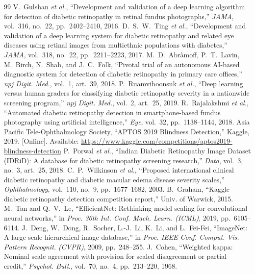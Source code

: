 \documentclass[conference]{IEEEtran}
\begin{document}
\begin{thebibliography}{99}
 V.~Gulshan \textit{et al.}, ``Development and validation of a deep learning algorithm for
detection of diabetic retinopathy in retinal fundus photographs,'' \textit{JAMA}, vol.~316, no.~22, pp.~2402--2410, 2016.
 D.~S.~W.~Ting \textit{et al.}, ``Development and validation of a deep learning system for diabetic
retinopathy and related eye diseases using retinal images from multiethnic populations with diabetes,''
\textit{JAMA}, vol.~318, no.~22, pp.~2211--2223, 2017.
 M.~D.~Abr\`amoff, P.~T.~Lavin, M.~Birch, N.~Shah, and J.~C.~Folk, ``Pivotal trial of an
autonomous AI-based diagnostic system for detection of diabetic retinopathy in primary care offices,''
\textit{npj Digit. Med.}, vol.~1, art.~39, 2018.
 P.~Ruamviboonsuk \textit{et al.}, ``Deep learning versus human graders for classifying
diabetic retinopathy severity in a nationwide screening program,'' \textit{npj Digit. Med.}, vol.~2, art.~25, 2019.
 R.~Rajalakshmi \textit{et al.}, ``Automated diabetic retinopathy detection in smartphone-based
fundus photography using artificial intelligence,'' \textit{Eye}, vol.~32, pp.~1138--1144, 2018.
 Asia Pacific Tele-Ophthalmology Society, ``APTOS 2019 Blindness Detection,'' Kaggle, 2019.
[Online]. Available: \url{https://www.kaggle.com/competitions/aptos2019-blindness-detection}
 P.~Porwal \textit{et al.}, ``Indian Diabetic Retinopathy Image Dataset (IDRiD): A database for
diabetic retinopathy screening research,'' \textit{Data}, vol.~3, no.~3, art.~25, 2018.
 C.~P.~Wilkinson \textit{et al.}, ``Proposed international clinical diabetic retinopathy and
diabetic macular edema disease severity scales,'' \textit{Ophthalmology}, vol.~110, no.~9, pp.~1677--1682, 2003.
 B.~Graham, ``Kaggle diabetic retinopathy detection competition report,'' Univ. of Warwick, 2015.
 M.~Tan and Q.~V.~Le, ``EfficientNet: Rethinking model scaling for convolutional neural networks,''
in \textit{Proc. 36th Int. Conf. Mach. Learn. (ICML)}, 2019, pp.~6105--6114.
 J.~Deng, W.~Dong, R.~Socher, L.-J.~Li, K.~Li, and L.~Fei-Fei, ``ImageNet: A large-scale
hierarchical image database,'' in \textit{Proc. IEEE Conf. Comput. Vis. Pattern Recognit. (CVPR)}, 2009, pp.~248--255.
 J.~Cohen, ``Weighted kappa: Nominal scale agreement with provision for scaled disagreement or
partial credit,'' \textit{Psychol. Bull.}, vol.~70, no.~4, pp.~213--220, 1968.

\end{thebibliography}
\end{document}
